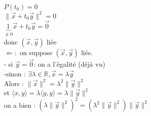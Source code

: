 \documentclass{article}
\begin{document}
$P(t_0)=0$ \\
$\|\vec x + t_0 \vec y \|^2=0$ \\
$\underbrace{1}_{\neq 0} \vec x + t_0 \vec y = \vec 0 $  \\
donc $(\vec x, \vec y)$ liée \\
$\Leftarrow :$ on suppose $(\vec x, \vec y)$ liée. \\
- si $\vec y =\vec 0$: on a l'égalité (déjà vu) \\
-sinon : $\exists \lambda \in \mathbb R, \vec x= \lambda \vec y$ \\
Alors : $\| \vec x \|^2= \lambda^2 \| \vec y \|^2$ \\
et $\langle x,y \rangle = \lambda \langle y,y \rangle= \lambda \| \vec y \|^2$ \\
on a bien : $( \lambda \| \vec y \|^2)^2=(\lambda^2 \| \vec y \|^2) \| \vec y \|^2$
\end{document}
